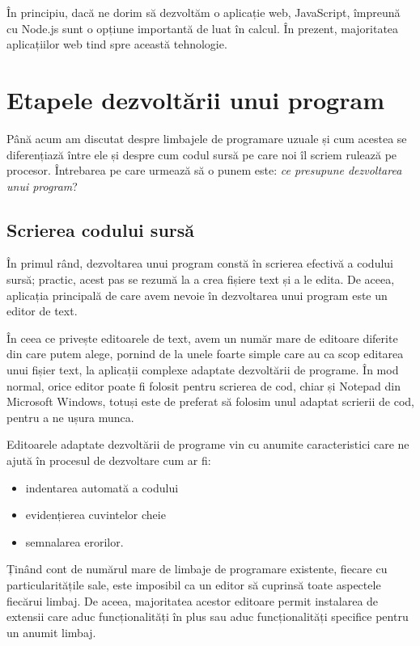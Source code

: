 În principiu, dacă ne dorim să dezvoltăm o aplicație web, JavaScript, împreună
cu Node.js sunt o opțiune importantă de luat în calcul. În prezent, majoritatea
aplicațiilor web tind spre această tehnologie.

\section{Etapele dezvoltării unui program}
\label{sec:appdev-steps}

Până acum am discutat despre limbajele de programare uzuale și cum acestea se
diferențiază între ele și despre cum codul sursă pe care noi îl scriem rulează
pe procesor. Întrebarea pe care urmează să o punem este: \textit{ce presupune
dezvoltarea unui program}?

\subsection{Scrierea codului sursă}
\label{sec:appdev-writing}

În primul rând, dezvoltarea unui program constă în scrierea efectivă a codului
sursă; practic, acest pas se rezumă la a crea fișiere text și a le edita. De
aceea, aplicația principală de care avem nevoie în dezvoltarea unui program este
un editor de text.

În ceea ce privește editoarele de text, avem un număr mare de editoare diferite
din care putem alege, pornind de la unele foarte simple care au ca scop editarea
unui fișier text, la aplicații complexe adaptate dezvoltării de programe. În mod
normal, orice editor poate fi folosit pentru scrierea de cod, chiar și Notepad
din Microsoft Windows, totuși este de preferat să folosim unul adaptat scrierii
de cod, pentru a ne ușura munca.

Editoarele adaptate dezvoltării de programe vin cu anumite caracteristici care
ne ajută în procesul de dezvoltare cum ar fi:

\begin{itemize}
	\item indentarea automată a codului
	\item evidențierea cuvintelor cheie
	\item semnalarea erorilor.
\end{itemize}

Ținând cont de numărul mare de limbaje de programare existente, fiecare cu
particularitățile sale, este imposibil ca un editor să cuprinsă toate aspectele
fiecărui limbaj. De aceea, majoritatea acestor editoare permit instalarea de
extensii care aduc funcționalități în plus sau aduc funcționalități specifice
pentru un anumit limbaj.

